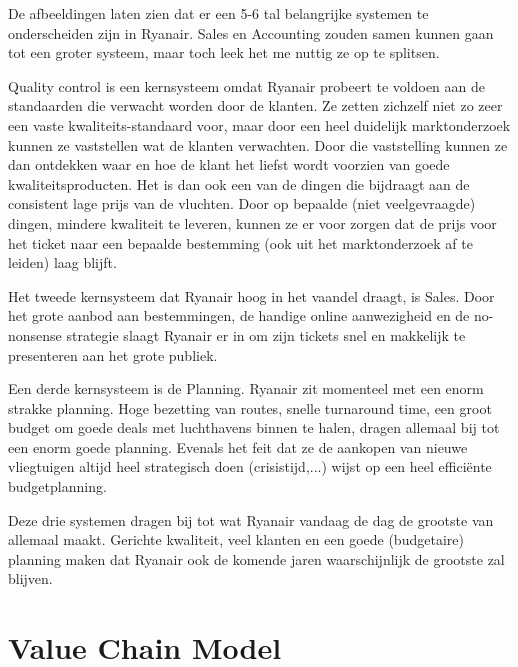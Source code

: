 \documentclass{article}
\begin{document}
\newpage

De afbeeldingen laten zien dat er een 5-6 tal belangrijke systemen te onderscheiden zijn in Ryanair. Sales en Accounting zouden samen kunnen gaan tot een groter systeem, maar toch leek het me nuttig ze op te splitsen.

Quality control is een kernsysteem omdat Ryanair probeert te voldoen aan de standaarden die verwacht worden door de klanten. Ze zetten zichzelf niet zo zeer een vaste kwaliteits-standaard voor, maar door een heel duidelijk marktonderzoek kunnen ze vaststellen wat de klanten verwachten. Door die vaststelling kunnen ze dan ontdekken waar en hoe de klant het liefst wordt voorzien van goede kwaliteitsproducten. Het is dan ook een van de dingen die bijdraagt aan de consistent lage prijs van de vluchten. Door op bepaalde (niet veelgevraagde) dingen, mindere kwaliteit te leveren, kunnen ze er voor zorgen dat de prijs voor het ticket naar een bepaalde bestemming (ook uit het marktonderzoek af te leiden) laag blijft.

Het tweede kernsysteem dat Ryanair hoog in het vaandel draagt, is Sales. Door het grote aanbod aan bestemmingen, de handige online aanwezigheid en de no-nonsense strategie slaagt Ryanair er in om zijn tickets snel en makkelijk te presenteren aan het grote publiek.

Een derde kernsysteem is de Planning. Ryanair zit momenteel met een enorm strakke planning. Hoge bezetting van routes, snelle turnaround time, een groot budget om goede deals met luchthavens binnen te halen, dragen allemaal bij tot een enorm goede planning. Evenals het feit dat ze de aankopen van nieuwe vliegtuigen altijd heel strategisch doen (crisistijd,...) wijst op een heel effici\"ente budgetplanning.

Deze drie systemen dragen bij tot wat Ryanair vandaag de dag de grootste van allemaal maakt. Gerichte kwaliteit, veel klanten en een goede (budgetaire) planning maken dat Ryanair ook de komende jaren waarschijnlijk de grootste zal blijven.


\part{Value Chain Model}
\end{document}
